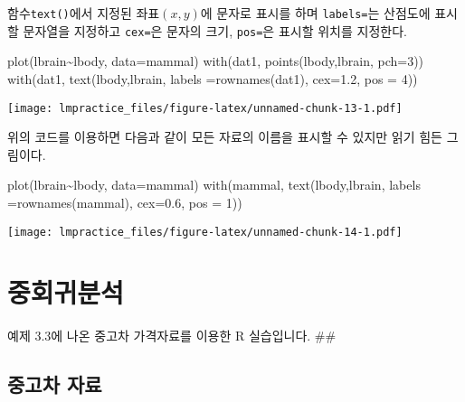 \documentclass[
]{book}
\newenvironment{Shaded}{\begin{snugshade}}{\end{snugshade}}
\newcommand{\AttributeTok}[1]{\textcolor[rgb]{0.77,0.63,0.00}{#1}}
\newcommand{\DecValTok}[1]{\textcolor[rgb]{0.00,0.00,0.81}{#1}}
\newcommand{\FloatTok}[1]{\textcolor[rgb]{0.00,0.00,0.81}{#1}}
\newcommand{\FunctionTok}[1]{\textcolor[rgb]{0.00,0.00,0.00}{#1}}
\newcommand{\NormalTok}[1]{#1}
\newcommand{\SpecialCharTok}[1]{\textcolor[rgb]{0.00,0.00,0.00}{#1}}
\begin{document}
함수\texttt{text()}에서 지정된 좌표\((x,y)\)에 문자로 표시를 하며 \texttt{labels=}는 산점도에 표시할 문자열을 지정하고 \texttt{cex=}은 문자의 크기, \texttt{pos=}은 표시할 위치를 지정한다.

\begin{Shaded}
\begin{Highlighting}[]
\FunctionTok{plot}\NormalTok{(lbrain}\SpecialCharTok{\textasciitilde{}}\NormalTok{lbody, }\AttributeTok{data=}\NormalTok{mammal)}
\FunctionTok{with}\NormalTok{(dat1, }\FunctionTok{points}\NormalTok{(lbody,lbrain, }\AttributeTok{pch=}\DecValTok{3}\NormalTok{))}
\FunctionTok{with}\NormalTok{(dat1, }\FunctionTok{text}\NormalTok{(lbody,lbrain, }\AttributeTok{labels =}\FunctionTok{rownames}\NormalTok{(dat1), }\AttributeTok{cex=}\FloatTok{1.2}\NormalTok{, }\AttributeTok{pos =} \DecValTok{4}\NormalTok{))}
\end{Highlighting}
\end{Shaded}

\texttt{[image: lmpractice\_files/figure-latex/unnamed-chunk-13-1.pdf]}

위의 코드를 이용하면 다음과 같이 모든 자료의 이름을 표시할 수 있지만 읽기 힘든 그림이다.

\begin{Shaded}
\begin{Highlighting}[]
\FunctionTok{plot}\NormalTok{(lbrain}\SpecialCharTok{\textasciitilde{}}\NormalTok{lbody, }\AttributeTok{data=}\NormalTok{mammal)}
\FunctionTok{with}\NormalTok{(mammal, }\FunctionTok{text}\NormalTok{(lbody,lbrain, }\AttributeTok{labels =}\FunctionTok{rownames}\NormalTok{(mammal), }\AttributeTok{cex=}\FloatTok{0.6}\NormalTok{, }\AttributeTok{pos =} \DecValTok{1}\NormalTok{))}
\end{Highlighting}
\end{Shaded}

\texttt{[image: lmpractice\_files/figure-latex/unnamed-chunk-14-1.pdf]}

\mainmatter

\hypertarget{chapter03}{%
\chapter{중회귀분석}\label{chapter03}}

예제 3.3에 나온 중고차 가격자료를 이용한 R 실습입니다.
\#\#

\hypertarget{uxc911uxace0uxcc28-uxc790uxb8cc}{%
\section{중고차 자료}\label{uxc911uxace0uxcc28-uxc790uxb8cc}}
\end{document}
